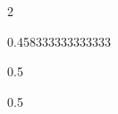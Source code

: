 \documentclass[gps1,twoside]{article}
\begin{document}
\begin{multicols}{2}
\begin{spacing}{0.458333333333333}{\raggedright}
\begin{spacing}{0.5}
}\spanenspanspanspansensespanspandiventryletData{8.5.1.4.1}\spanabbreviationsemanticdomainsemanticdomainssensesensessensesensessubentrysubentriesentrylastchildafterspanspanspansensespanspandiventryletData{ - }\spannameacademicdomainacademicdomainssensesensessensesensessubentrysubentriesentryfirstchildbeforespanspanspansensespanspandiventryletData{(}\spanenspanspanspansensespanspandiventryletData{Out, outside}\spannameacademicdomainacademicdomainssensesensessensesensessubentrysubentriesentrylastchildafterspanspanspansensespanspandiventryletData{)}\semanticdomainssensesensesentryaftersensespanspandiventryletData{.) }\sensesentryafterdiventryletData{}\end{spacing}
\begin{spacing}{0.5}
\spanmainheadwordentrylastchildafterspandiventryletData{ }\spanformpronunciationpronunciationssubentrysubentriesentryfirstchildbeforespanpronunciationspandiventryletData{[}\spanformpronunciationpronunciationssubentrysubentriesentrylastchildafterspanpronunciationspandiventryletData{]}\pronunciationsentryafterdiventryletData{ }\end{spacing}
\begin{spacing}{0.5}

\end{spacing}
\end{spacing}
\end{multicols}
\end{document}
